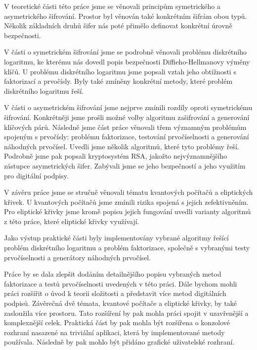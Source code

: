 \documentclass[
  program=infoi,
  biblatex=false,
  figures=true,
  glossaries,
  tables=false,
  sourcecodes=true,
  index
]{kidiplom}
\begin{document}
    

\begin{kiconclusions}
    
    V teoretické části této práce jsme se věnovali principům symetrického a asymetrického šifrování.
    Prostor byl věnován také konkrétním šifrám obou typů.
    Několik základních druhů šifer nás poté přimělo definovat konkrétní úrovně bezpečnosti.

    V části o symetrickém šifrování jsme se podrobně věnovali problému diskrétního logaritmu, ke kterému
    nás dovedl popis bezpečnosti Diffieho-Hellmanovy výměny klíčů.
    U problému diskrétního logaritmu jsme popsali vztah jeho obtížnosti s faktorizací a prvočísly.
    Byly také zmíněny konkrétní metody, které problém diskrétního logaritmu řeší.

    V části o asymetrickém šifrování jsme nejprve zmínili rozdíly oproti symetrickému šifrování.
    Konkrétněji jsme prošli možné volby algoritmu zašifrování a generování klíčových párů.
    Následně jsme část práce věnovali třem významným problémům spojeným s prvočísly: problému faktorizace, testování
    prvočíselnosti a generování náhodných prvočísel.
    Uvedli jsme několik algoritmů, které tyto problémy řeší.
    Podrobně jsme pak popsali kryptosystém RSA, jakožto nejvýznamnějšího zástupce asymetrických šifer.
    Zabývali jsme se jeho bezpečností a jeho využitím pro digitální podpisy.

    V závěru práce jsme se stručně věnovali tématu kvantových počítačů a eliptických křivek.
    U kvantových počítačů jsme zmínili rizika spojená s jejich zefektivněním.
    Pro eliptické křivky jsme kromě popisu jejich fungování uvedli varianty algoritmů z této práce, které
    eliptické křivky využívají.

    Jako výstup praktické části byly implementovány vybrané algoritmy řešící problém diskrétního logaritmu a problém faktorizace, společně
    s vybranými testy prvočíselnosti a generátory náhodných prvočísel.

    Práce by se dala zlepšit dodáním detailnějšího popisu vybraných metod faktorizace a testů prvočíselnosti uvedených v této práci.
    Dále bychom mohli práci rozšířit o úvod k teorii složitosti a představit více metod digitálních podpisů.
    Závěrečná dvě témata, kvantové počítače a eliptické křivky, by také zasloužila více prostoru.
    Tato rozšíření by pak mohla práci spojit v uzavřenější a komplexnější celek.
    Praktická část by pak mohla být rozšířena o konzolové rozhraní nasazené na triviální aplikaci, která by
    implementované metody používala. Následně by pak mohlo být přidáno grafické uživatelské rozhraní.

\end{kiconclusions}
\end{document}
